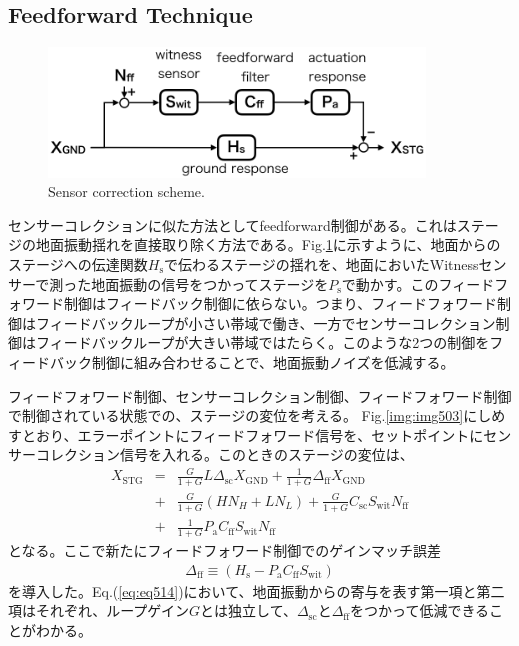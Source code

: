 \subsection{Feedforward Technique}
\begin{figure}[h]
  \begin{center}   
    \includegraphics[width=10cm]{./img_chap5/img506.png}
    \caption{Sensor correction scheme.} \label{img:img506}
  \end{center}
\end{figure}
センサーコレクションに似た方法としてfeedforward制御がある。これはステージの地面振動揺れを直接取り除く方法である。Fig.\ref{img:img506}に示すように、地面からのステージへの伝達関数$H_{\mathrm{s}}$で伝わるステージの揺れを、地面においたWitnessセンサーで測った地面振動の信号をつかってステージを$P_{\mathrm{s}}$で動かす。このフィードフォワード制御はフィードバック制御に依らない。つまり、フィードフォワード制御はフィードバックループが小さい帯域で働き、一方でセンサーコレクション制御はフィードバックループが大きい帯域ではたらく。このような2つの制御をフィードバック制御に組み合わせることで、地面振動ノイズを低減する。

フィードフォワード制御、センサーコレクション制御、フィードフォワード制御で制御されている状態での、ステージの変位を考える。
Fig.\ref{img:img503}にしめすとおり、エラーポイントにフィードフォワード信号を、セットポイントにセンサーコレクション信号を入れる。このときのステージの変位は、
\begin{eqnarray}\nonumber
  X_{\mathrm{STG}} &=&\frac{G}{1+G}L\Delta_{\mathrm{sc}} X_{\mathrm{GND}} + \frac{1}{1+G} \Delta_{\mathrm{ff}} X_{\mathrm{GND}}\\ \nonumber
  &+& \frac{G}{1+G}\left(HN_{H}+LN_{L}\right) + \frac{G}{1+G}C_{\mathrm{sc}}S_{\mathrm{wit}}N_{\mathrm{ff}} \\ 
  &+& \frac{1}{1+G}P_{\mathrm{a}} C_{\mathrm{ff}}S_{\mathrm{wit}}N_{\mathrm{ff}} \label{eq:eq514}
\end{eqnarray}
となる。ここで新たにフィードフォワード制御でのゲインマッチ誤差
\begin{eqnarray}
  \Delta_{\mathrm{ff}} \equiv \left(H_{\mathrm{s}}-P_{\mathrm{a}}C_{\mathrm{ff}}S_{\mathrm{wit}}\right) \label{eq:eq515}
\end{eqnarray}
を導入した。Eq.(\ref{eq:eq514})において、地面振動からの寄与を表す第一項と第二項はそれぞれ、ループゲイン$G$とは独立して、$\Delta_{\mathrm{sc}}$と$\Delta_{\mathrm{ff}}$をつかって低減できることがわかる。


